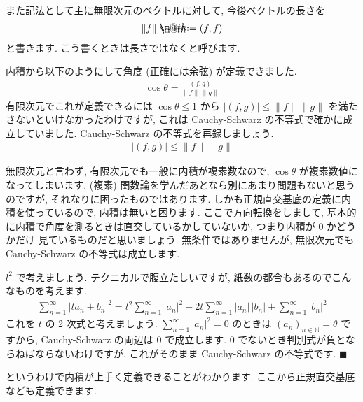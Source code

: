 \documentclass[openany, a4paper, oneside]{book}
\makeatletter
\newcommand*{\defeq}{\mathrel{\rlap{%
\raisebox{0.3ex}{$\m@th\cdot$}}%
\raisebox{-0.3ex}{$\m@th\cdot$}}%
=}
\theoremstyle{break}
\theoremstyle{breakdefn}
\newcommand{\abs}[1]{\left|#1\right|}
\makeatother
\begin{document}
また記法として主に無限次元のベクトルに対して, 今後ベクトルの長さを
    \begin{align}
        \| f \| \defeq (f,f)
    \end{align}
と書きます. こう書くときは長さではなくと呼びます.

内積から以下のようにして角度 (正確には余弦) が定義できました.
\begin{align}
\cos \theta = \frac{(f,g)}{\| f \| \, \| g \|}
\end{align}
有限次元でこれが定義できるには $\cos \theta \leq 1$ から $|(f,g)| \leq \|f\| \, \|g \|$ を満たさないといけなかったわけですが,
これは Cauchy-Schwarz の不等式で確かに成立していました. Cauchy-Schwarz の不等式を再録しましょう.
\begin{align}
\abs{(f,g)} \leq \| f \| \, \| g \|
\end{align}

無限次元と言わず, 有限次元でも一般に内積が複素数なので,  $\cos \theta$ が複素数値になってしまいます.
(複素) 関数論を学んだあとなら別にあまり問題もないと思うのですが, それなりに困ったものではあります.
しかも正規直交基底の定義に内積を使っているので, 内積は無いと困ります.
ここで方向転換をしまして, 基本的に内積で角度を測るときは直交しているかしていないか, つまり内積が $0$ かどうかだけ
見ているものだと思いましょう.
無条件ではありませんが, 無限次元でも Cauchy-Schwarz の不等式は成立します.

 $l^2$ で考えましょう. テクニカルで腹立たしいですが, 紙数の都合もあるのでこんなものを考えます.
    \begin{align}
        \sum_{n=1}^{\infty} |ta_n + b_n|^2
        =
        t^2\sum_{n=1}^{\infty} |a_n|^2 + 2t \sum_{n=1}^{\infty} |a_n|\,|b_n| +\sum_{n=1}^{\infty} |b_n|^2
    \end{align}
これを $t$ の 2 次式と考えましょう.  $\sum_{n=1}^{\infty} |a_n|^2=0$ のときは $(a_n)_{n \in \mathbb{N}}=\theta$ ですから,
Cauchy-Schwarz の両辺は $0$ で成立します.  $0$ でないとき判別式が負とならねばならないわけですが, これがそのまま
Cauchy-Schwarz の不等式です.  $\blacksquare$

というわけで内積が上手く定義できることがわかります.
ここから正規直交基底なども定義できます.
\end{document}
